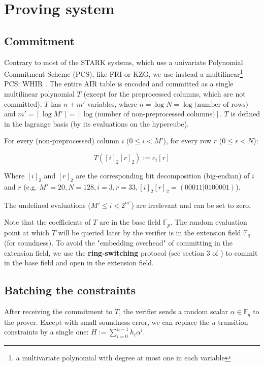 \documentclass{article}
\newcommand{\Fp}{\mathbb F_p}
\newcommand{\Fq}{\mathbb F_q}
\newcommand{\Pol}{T}
\begin{document}
\section{Proving system}

\subsection{{Commitment}}

Contrary to most of the STARK systems, which use a univariate Polynomial Commitment Scheme (PCS), like FRI or KZG, we use instead a multilinear\footnote{a multivariate polynomial with degree at most one in each variable} PCS: WHIR \cite{whir}. The entire AIR table is encoded and committed as a single multilinear polynomial $\Pol$ (except for the preprocessed columns, which are not committed). $\Pol$ has $n + m'$ variables, where $n = \log N = \log \text{(number of rows)}$ and $m' = \left\lceil  \log M' \right\rceil = \left\lceil  \log \text{(number of non-preprocessed columns)} \right\rceil$. $\Pol$ is defined in the lagrange basis (by its evaluations on the hypercube).

For every (non-preprocessed) column $i$ ($0 \leq i < M'$), for every row $r$ ($0 \leq r < N$): 

$$\Pol([i]_2 [r]_2) := c_{i}[r]$$

Where $[i]_2$ and $[r]_2$ are the corresponding bit decomposition (big-endian) of $i$ and $r$ (e.g. $M' = 20, N = 128, i = 3, r = 33, [i]_2[r]_2 = (00011 | 0100001)$).

The undefined evaluations ($M' \leq i < 2^{m'}$) are irrelevant and can be set to zero.

Note that the coefficients of $\Pol$ are in the base field $\Fp$. The random evaluation point at which $\Pol$ will be queried later by the verifier is in the extension field $\Fq$ (for soundness). To avoid the "embedding overhead" of committing in the extension field, we use the \textbf{ring-switching} protocol (see section 3 of \cite{fri_binius}) to commit in the base field and open in the extension field.

\subsection{Batching the constraints}

After receiving the commitment to $\Pol$, the verifier sends a random scalar $\alpha \in \Fq$ to the prover. Except with small soundness error, we can replace the $u$ transition constraints by a single one: $H := \sum_{i=0}^{u-1} h_i \alpha^i $.
\end{document}

